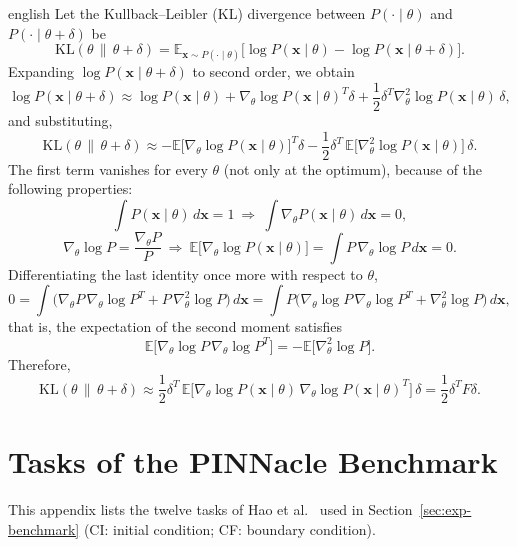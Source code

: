 \documentclass[12pt,letterpaper,twoside]{book}
\begin{document}
\begin{hyphenrules}{english}
Let the Kullback--Leibler (KL) divergence between $P(\cdot\mid\theta)$ and $P(\cdot\mid\theta+\delta)$ be
\cite{pascanu2013}
\[
  \mathrm{KL}(\theta\,\|\,\theta+\delta)=\mathbb{E}_{\mathbf{x}\sim P(\cdot\mid\theta)}\big[\log P(\mathbf{x}\mid\theta)-\log P(\mathbf{x}\mid\theta+\delta)\big].
\]
Expanding $\log P(\mathbf{x}\mid\theta+\delta)$ to second order, we obtain
\[
  \log P(\mathbf{x}\mid\theta+\delta)\approx\log P(\mathbf{x}\mid\theta)+\nabla_\theta\log P(\mathbf{x}\mid\theta)^{T}\delta
  +\frac12\delta^{T}\nabla^2_\theta\log P(\mathbf{x}\mid\theta)\,\delta,
\]
and substituting,
\begin{equation}
  \mathrm{KL}(\theta\,\|\,\theta+\delta)\approx-\mathbb{E}\big[\nabla_\theta\log P(\mathbf{x}\mid\theta)\big]^{T}\delta
  -\frac12\delta^{T}\,\mathbb{E}\big[\nabla^2_\theta\log P(\mathbf{x}\mid\theta)\big]\,\delta.
  \label{eq:app-kl}
\end{equation}
The first term vanishes for every $\theta$ (not only at the optimum), because of the following properties:
\[
  \int P(\mathbf{x}\mid\theta)\,d\mathbf{x}=1\ \Rightarrow\ \int\nabla_\theta P(\mathbf{x}\mid\theta)\,d\mathbf{x}=0,
\]
\[
  \nabla_\theta\log P=\frac{\nabla_\theta P}{P}\ \Rightarrow\
  \mathbb{E}\big[\nabla_\theta\log P(\mathbf{x}\mid\theta)\big]=\int P\,\nabla_\theta\log P\,d\mathbf{x}=0.
\]
Differentiating the last identity once more with respect to $\theta$,
\[
  0=\int\Big(\nabla_\theta P\,\nabla_\theta\log P^{T}+P\,\nabla^2_\theta\log P\Big)\,d\mathbf{x}
   =\int P\Big(\nabla_\theta\log P\,\nabla_\theta\log P^{T}+\nabla^2_\theta\log P\Big)\,d\mathbf{x},
\]
that is, the expectation of the second moment satisfies
\[
  \mathbb{E}\big[\nabla_\theta\log P\,\nabla_\theta\log P^{T}\big]=-\mathbb{E}\big[\nabla^2_\theta\log P\big].
\]
Therefore,
\[
  \mathrm{KL}(\theta\,\|\,\theta+\delta)\approx\frac12\delta^{T}\,
  \mathbb{E}\big[\nabla_\theta\log P(\mathbf{x}\mid\theta)\,\nabla_\theta\log P(\mathbf{x}\mid\theta)^{T}\big]\,\delta
  =\frac12\delta^{T}F\delta.
\]

\chapter{Tasks of the PINNacle Benchmark}\label{app:benchmark}

This appendix lists the twelve tasks of Hao et al.~\cite{hao2024pinnacle} used in Section~\ref{sec:exp-benchmark}
(CI: initial condition; CF: boundary condition).


\end{hyphenrules}
\end{document}
